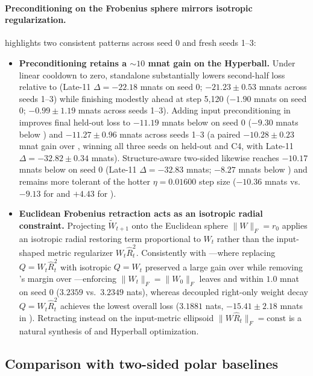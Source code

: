 \paragraph{Preconditioning on the Frobenius sphere mirrors isotropic regularization.}
 highlights two consistent patterns across seed 0 and fresh seeds 1--3:
\begin{itemize}
 \item \textbf{Preconditioning retains a $\sim\!10$ mnat gain on the Hyperball.} Under linear cooldown to zero, standalone  substantially lowers second-half loss relative to  (Late-11 $\Delta=-22.18$ mnats on seed 0; $-21.23\pm0.53$ mnats across seeds 1--3) while finishing modestly ahead at step 5,120 ($-1.90$ mnats on seed 0; $-0.99\pm1.19$ mnats across seeds 1--3). Adding input preconditioning in  improves final held-out loss to $-11.19$ mnats below  on seed 0 ($-9.30$ mnats below ) and $-11.27\pm0.96$ mnats across seeds 1--3 (a paired $-10.28\pm0.23$ mnat gain over , winning all three seeds on held-out and C4, with Late-11 $\Delta=-32.82\pm0.34$ mnats). Structure-aware two-sided  likewise reaches $-10.17$ mnats below  on seed 0 (Late-11 $\Delta=-32.83$ mnats; $-8.27$ mnats below ) and remains more tolerant of the hotter $\eta=0.01600$ step size ($-10.36$ mnats vs.\ $-9.13$ for  and $+4.43$ for ).
 \item \textbf{Euclidean Frobenius retraction acts as an isotropic radial constraint.} Projecting $\widetilde W_{t+1}$ onto the Euclidean sphere $\|W\|_F=r_0$ applies an isotropic radial restoring term proportional to $W_t$ rather than the input-shaped metric regularizer $W_t\hat R_t^2$. Consistently with ---where replacing $Q=W_t\hat R_t^2$ with isotropic $Q=W_t$ preserved a large gain over  while removing 's margin over ---enforcing $\|W_t\|_F=\|W_0\|_F$ leaves  and  within $1.0$ mnat on seed 0 ($3.2359$ vs.\ $3.2349$ nats), whereas decoupled right-only weight decay $Q=W_t\hat R_t^2$ achieves the lowest overall loss ($3.1881$ nats, $-15.41\pm2.18$ mnats in ). Retracting instead on the input-metric ellipsoid $\|W\hat R_t\|_F=\text{const}$ is a natural synthesis of  and Hyperball optimization.
\end{itemize}

\subsection{Comparison with two-sided polar baselines}
\label{sec:related_baselines}

